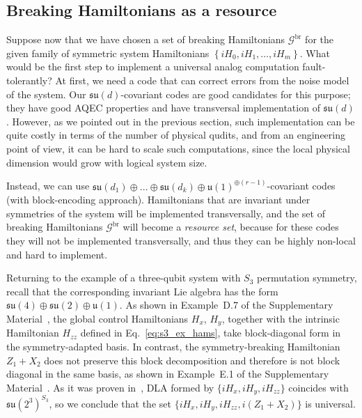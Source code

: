 \documentclass[10pt,twocolumn,superscriptaddress,aps,amsmath,amssymb,citeautoscript,floatfix,prx,longbibliography]{revtex4-2}
\newcounter{alg}
\theoremstyle{plain}
\theoremstyle{plain}
\theoremstyle{plain}
\theoremstyle{plain}
\theoremstyle{plain}
\theoremstyle{plain}
\begin{document}
\subsection{Breaking Hamiltonians as a resource}\label{subsec:main_H_br_resource}

Suppose now that we have chosen a set of breaking Hamiltonians
\(\mathcal{G}^{\text{br}}\) for the given family of symmetric system Hamiltonians $\left\{i H_0, i H_1, \ldots, i H_m\right\}$. What would be the first step to implement a universal analog computation fault-tolerantly? At first, we need a code that can correct errors from the noise model of the system. Our $\mathfrak{su}(d)$-covariant codes are good candidates for this purpose; they have good AQEC properties and have transversal implementation of $\mathfrak{su}(d)$. However, as we pointed out in the previous section, such implementation can be quite costly in terms of the number of physical qudits, and from an engineering point of view, it can be hard to scale such computations, since the local physical dimension would grow with logical system size. 

Instead, we can use $\mathfrak{su}(d_1)\oplus...\oplus\mathfrak{su}(d_k)\oplus \mathfrak{u}(1)^{\oplus(r-1)}$-covariant codes (with block-encoding approach). Hamiltonians that are invariant under symmetries of the system will be implemented transversally, and the set of breaking Hamiltonians $\mathcal{G}^{\text{br}}$ will become a \textit{resource set}, because for these codes they will not be implemented transversally, 
and thus they can be highly non-local and hard to implement.

Returning to the example of a three-qubit system with \(S_3\) permutation symmetry, recall that the corresponding invariant Lie algebra has the form
\(\mathfrak{su}(4)\oplus \mathfrak{su}(2)\oplus \mathfrak{u}(1).\)
As shown in Example~D.7 of the Supplementary Material~\cite{SuppMat}, the global control Hamiltonians \(H_x\), \(H_y\), together with the intrinsic Hamiltonian \(H_{zz}\) defined in Eq.~\eqref{eq:s3_ex_hams}, take block-diagonal form in the symmetry-adapted basis. In contrast, the symmetry-breaking Hamiltonian \(Z_1+X_2\) does not preserve this block decomposition and therefore is not block diagonal in the same basis, as shown in Example~E.1 of the Supplementary Material~\cite{SuppMat}. 
As it was proven in~\cite{Albertini2018}, DLA formed by $\{iH_x, iH_y, iH_{zz}\}$ coincides with $\mathfrak{su}(2^3)^{S_3}$, so we conclude that the set  $\{iH_x, iH_y, iH_{zz}, i(Z_1+X_2)\}$ is universal.
\end{document}
